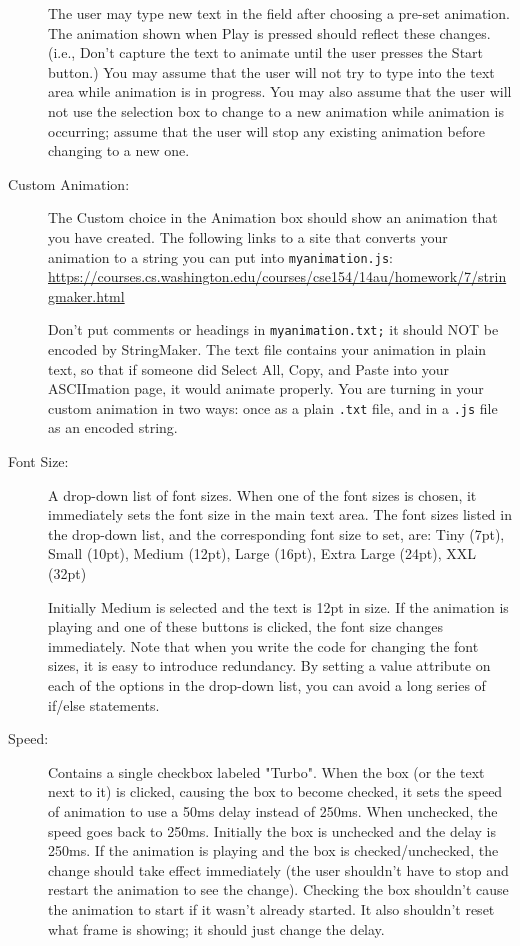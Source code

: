 \documentclass{article}
\begin{document}
\begin{description}
The user may type new text in the field after choosing a pre-set
animation.  The animation shown when Play is pressed should reflect
these changes.  (i.e., Don't capture the text to animate until the
user presses the Start button.)  You may assume that the user will not
try to type into the text area while animation is in progress.  You
may also assume that the user will not use the selection box to change
to a new animation while animation is occurring; assume that the user
will stop any existing animation before changing to a new one.

\item[Custom Animation:] The Custom choice in the Animation box should
  show an animation that you have created.  The following links to a
  site that
  converts your animation to a string you can put into
  {\tt myanimation.js}:\\
  \url{https://courses.cs.washington.edu/courses/cse154/14au/homework/7/stringmaker.html}

  Don't put comments or headings in {\tt myanimation.txt;} it should
  NOT be encoded by StringMaker.  The text file contains your
  animation in plain text, so that if someone did Select All, Copy,
  and Paste into your ASCIImation page, it would animate properly.
  You are turning in your custom animation in two ways: once as a
  plain {\tt .txt} file, and in a {\tt .js} file as an encoded string.

\item[Font Size:] A drop-down list of font sizes. When one of the font
  sizes is chosen, it immediately sets the font size in the main text
  area.  The font sizes listed in the drop-down list, and the
  corresponding font size to set, are: Tiny (7pt), Small (10pt),
  Medium (12pt), Large (16pt), Extra Large (24pt), XXL (32pt)

  Initially Medium is selected and the text is 12pt in size. If the
  animation is playing and one of these buttons is clicked, the font
  size changes immediately.  Note that when you write the code for
  changing the font sizes, it is easy to introduce redundancy.  By
  setting a value attribute on each of the options in the drop-down
  list, you can avoid a long series of if/else statements.

\item[Speed:] Contains a single checkbox labeled "Turbo".  When the
  box (or the text next to it) is clicked, causing the box to become
  checked, it sets the speed of animation to use a 50ms delay instead
  of 250ms.  When unchecked, the speed goes back to 250ms.  Initially
  the box is unchecked and the delay is 250ms.  If the animation is
  playing and the box is checked/unchecked, the change should take
  effect immediately (the user shouldn't have to stop and restart the
  animation to see the change).  Checking the box shouldn't cause the
  animation to start if it wasn't already started.  It also shouldn't
  reset what frame is showing; it should just change the delay.


\end{description}
\end{document}
